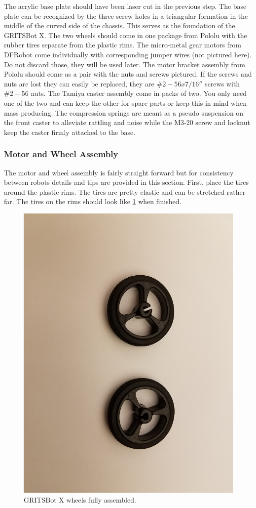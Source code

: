 The acrylic base plate should have been laser cut in the previous step. The base plate can be recognized by the three screw holes in a triangular formation in the middle of the curved side of the chassis. This serves as the foundation of the GRITSBot X. The two wheels should come in one package from Pololu with the rubber tires separate from the plastic rims. The micro-metal gear motors from DFRobot come individually with corresponding jumper wires (not pictured here). Do not discard those, they will be used later.  The motor bracket assembly from Pololu should come as a pair with the nuts and screws pictured.  If the screws and nuts are lost they can easily be replaced, they are $\#2-56x7/16''$ screws with $\#2-56$ nuts. The Tamiya caster assembly come in packs of two. You only need one of the two and can keep the other for spare parts or keep this in mind when mass producing. The compression springs are meant as a pseudo suspension on the front caster to alleviate rattling and noise while the M3-20 screw and locknut keep the caster firmly attached to the base.

\subsubsection{Motor and Wheel Assembly}
\label{sec:motorAssembly}

The motor and wheel assembly is fairly straight forward but for consistency between robots details and tips are provided in this section. First, place the tires around the plastic rims. The tires are pretty elastic and can be stretched rather far. The tires on the rims should look like \cref{fig:tires} when finished.

\begin{figure}[h!]
\centering
\includegraphics[width=0.65\columnwidth, keepaspectratio]{./figs/20181219_112356.jpg}
\caption{GRITSBot X wheels fully assembled.}
\label{fig:tires}
\end{figure}

